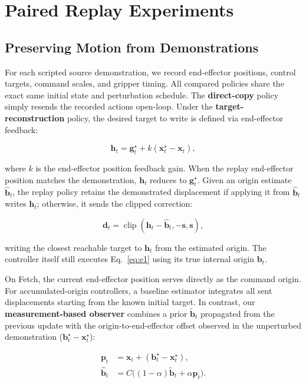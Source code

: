 \section{Paired Replay Experiments}

\subsection{Preserving Motion from Demonstrations}

For each scripted source demonstration, we record end-effector positions, control targets, command scales, and gripper timing. All compared policies share the exact same initial state and perturbation schedule. The \textbf{direct-copy} policy simply resends the recorded actions open-loop. Under the \textbf{target-reconstruction} policy, the desired target to write is defined via end-effector feedback:

\begin{equation}
\mathbf{h}_t = \mathbf{g}_t^\star + k(\mathbf{x}_t^\star - \mathbf{x}_t),
\label{eq:e4}
\end{equation}

where $k$ is the end-effector position feedback gain. When the replay end-effector position matches the demonstration, $\mathbf{h}_t$ reduces to $\mathbf{g}_t^\star$. Given an origin estimate $\widehat{\mathbf{b}}_t$, the replay policy retains the demonstrated displacement if applying it from $\widehat{\mathbf{b}}_t$ writes $\mathbf{h}_t$; otherwise, it sends the clipped correction:

\[
\mathbf{d}_t = \operatorname{clip}(\mathbf{h}_t - \widehat{\mathbf{b}}_t, -\mathbf{s}, \mathbf{s}),
\]

writing the closest reachable target to $\mathbf{h}_t$ from the estimated origin. The controller itself still executes Eq.~\eqref{eq:e1} using its true internal origin $\mathbf{b}_t$.

On Fetch, the current end-effector position serves directly as the command origin. For accumulated-origin controllers, a baseline estimator integrates all sent displacements starting from the known initial target. In contrast, our \textbf{measurement-based observer} combines a prior $\widetilde{\mathbf{b}}_t$ propagated from the previous update with the origin-to-end-effector offset observed in the unperturbed demonstration ($\mathbf{b}_t^\star - \mathbf{x}_t^\star$):

\begin{equation}
\begin{aligned}
\mathbf{p}_t &= \mathbf{x}_t + (\mathbf{b}_t^\star - \mathbf{x}_t^\star), \\
\widehat{\mathbf{b}}_t &= C\big((1 - \alpha)\widetilde{\mathbf{b}}_t + \alpha \mathbf{p}_t\big).
\end{aligned}
\label{eq:e5}
\end{equation}

